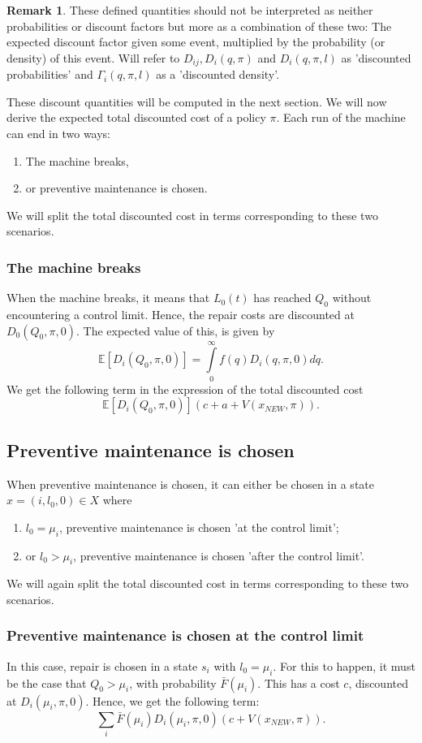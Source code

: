 \documentclass[a4paper]{thesis}
\theoremstyle{definition}
\newtheorem{remark}{Remark}[chapter]
\begin{document}
\begin{remark}
	These defined quantities should not be interpreted as neither probabilities or discount factors but more as a combination of these two: The expected discount factor given some event, multiplied by the probability (or density) of this event.
	Will refer to $D_{ij},D_{i}(q,\pi)$ and $D_{i}(q,\pi,l)$ as 'discounted probabilities' and $\Gamma_i(q,\pi,l)$ as a 'discounted density'.
\end{remark}
These discount quantities will be computed in the next section.
We will now derive the expected total discounted cost of a policy $\pi$.
Each run of the machine can end in two ways:
\begin{enumerate}
	\item The machine breaks,
	\item or preventive maintenance is chosen.
\end{enumerate}
We will split the total discounted cost in terms corresponding to these two scenarios.

\subsubsection{The machine breaks}
When the machine breaks, it means that $L_0(t)$ has reached $Q_0$ without encountering a control limit.
Hence, the repair costs are discounted at $D_0(Q_0,\pi,0)$.
The expected value of this, is given by
\[
\mathbb{E}[D_{i}(Q_0,\pi,0)]=\int\limits_0^\infty f(q)D_{i}(q,\pi,0)dq.
\]
We get the following term in the expression of the total discounted cost
\[
\mathbb{E}[D_{i}(Q_0,\pi,0)](c+a+V(x_{NEW},\pi)).
\]

\subsection{Preventive maintenance is chosen}
When preventive maintenance is chosen, it can either be chosen in a state $x=(i,l_0,0)\in X$ where
\begin{enumerate}
	\item $l_0=\mu_i$, preventive maintenance is chosen 'at the control limit';
	\item or $l_0>\mu_i$, preventive maintenance is chosen 'after the control limit'.
\end{enumerate}
We will again split the total discounted cost in terms corresponding to these two scenarios.

\subsubsection{Preventive maintenance is chosen at the control limit}
In this case, repair is chosen in a state $s_i$ with $l_0=\mu_i$.
For this to happen, it must be the case that $Q_0>\mu_i$, with probability $\bar{F}(\mu_i)$.
This has a cost $c$, discounted at $D_{i}(\mu_i,\pi,0)$.
Hence, we get the following term:
\[
\sum\limits_i\bar{F}(\mu_i)D_{i}(\mu_i,\pi,0)(c+V(x_{NEW},\pi)).
\]
\end{document}
